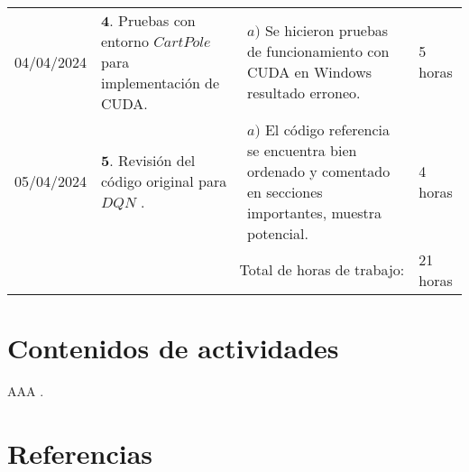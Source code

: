\documentclass[12pt]{article}
\begin{document}
\hfill\\
\begin{minipage}[h]{\textwidth}
	\centering
	\begin{tabularx}{\textwidth}{|p{2cm}|X|X|p{2cm}|} 
		\hline		
		
	 	04/04/2024 & 
	 	$\mathbf{4}.$ Pruebas con entorno $CartPole$ para implementación de CUDA. &
	 	$a)$ Se hicieron pruebas de funcionamiento con CUDA en Windows resultado erroneo. \newline & 
	 	5 horas \\
	 	05/04/2024 & 
	 	$\mathbf{5}.$ Revisión del código original para $DQN$ \cite{DQNCart}. &
	 	$a)$ El código referencia se encuentra bien ordenado y comentado en secciones importantes, muestra potencial. \newline & 
	 	4 horas \\
	 	
	 	\hline
		\multicolumn{3}{|r|}{Total de horas de trabajo:} & 21 horas \\ 
	 	\hline                 
	\end{tabularx}
\end{minipage}




\section*{Contenidos de actividades}

AAA \cite{DQNCart}.


\newpage

\section*{Referencias}
\renewcommand\refname{}


\end{document}
